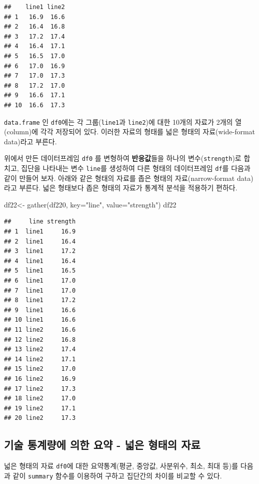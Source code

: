 \documentclass[
]{book}
\newenvironment{Shaded}{\begin{snugshade}}{\end{snugshade}}
\newcommand{\AttributeTok}[1]{\textcolor[rgb]{0.77,0.63,0.00}{#1}}
\newcommand{\FunctionTok}[1]{\textcolor[rgb]{0.00,0.00,0.00}{#1}}
\newcommand{\NormalTok}[1]{#1}
\newcommand{\OtherTok}[1]{\textcolor[rgb]{0.56,0.35,0.01}{#1}}
\newcommand{\StringTok}[1]{\textcolor[rgb]{0.31,0.60,0.02}{#1}}
\begin{document}
\begin{verbatim}
##    line1 line2
## 1   16.9  16.6
## 2   16.4  16.8
## 3   17.2  17.4
## 4   16.4  17.1
## 5   16.5  17.0
## 6   17.0  16.9
## 7   17.0  17.3
## 8   17.2  17.0
## 9   16.6  17.1
## 10  16.6  17.3
\end{verbatim}

\texttt{data.frame} 인 \texttt{df0}에는 각 그룹(\texttt{line1}과 \texttt{line2})에 대한 10개의 자료가 2개의 열(column)에 각각 저장되어 있다. 이러한 자료의 형태를 넓은 형태의 자료(wide-format data)라고 부른다.

위에서 만든 데이터프레임 \texttt{df0} 를 변형하여 \textbf{반응값}들을 하나의 변수(\texttt{strength})로 합치고, 집단을 나타내는 변수 \texttt{line}를 생성하여 다른 형태의 데이터프레임 \texttt{df}를 다음과 같이 만들어 보자. 아래와 같은 형태의 자료를 좁은 형태의 자료(narrow-format data)라고 부른다. 넓은 형태보다 좁은 형태의 자료가 통계적 분석을 적용하기 편하다.

\begin{Shaded}
\begin{Highlighting}[]
\NormalTok{df22}\OtherTok{\textless{}{-}} \FunctionTok{gather}\NormalTok{(df220,  }\AttributeTok{key=}\StringTok{"line"}\NormalTok{, }\AttributeTok{value=}\StringTok{"strength"}\NormalTok{) }
\NormalTok{df22}
\end{Highlighting}
\end{Shaded}

\begin{verbatim}
##     line strength
## 1  line1     16.9
## 2  line1     16.4
## 3  line1     17.2
## 4  line1     16.4
## 5  line1     16.5
## 6  line1     17.0
## 7  line1     17.0
## 8  line1     17.2
## 9  line1     16.6
## 10 line1     16.6
## 11 line2     16.6
## 12 line2     16.8
## 13 line2     17.4
## 14 line2     17.1
## 15 line2     17.0
## 16 line2     16.9
## 17 line2     17.3
## 18 line2     17.0
## 19 line2     17.1
## 20 line2     17.3
\end{verbatim}

\hypertarget{uxae30uxc220-uxd1b5uxacc4uxb7c9uxc5d0-uxc758uxd55c-uxc694uxc57d---uxb113uxc740-uxd615uxd0dcuxc758-uxc790uxb8cc}{%
\subsection{기술 통계량에 의한 요약 - 넓은 형태의 자료}\label{uxae30uxc220-uxd1b5uxacc4uxb7c9uxc5d0-uxc758uxd55c-uxc694uxc57d---uxb113uxc740-uxd615uxd0dcuxc758-uxc790uxb8cc}}

넓은 형태의 자료 \texttt{df0}에 대한 요약통계(평균, 중앙값, 사분위수, 최소, 최대 등)를 다음과 같이 \texttt{summary} 함수를 이용하여 구하고 집단간의 차이를 비교할 수 있다.
\end{document}
